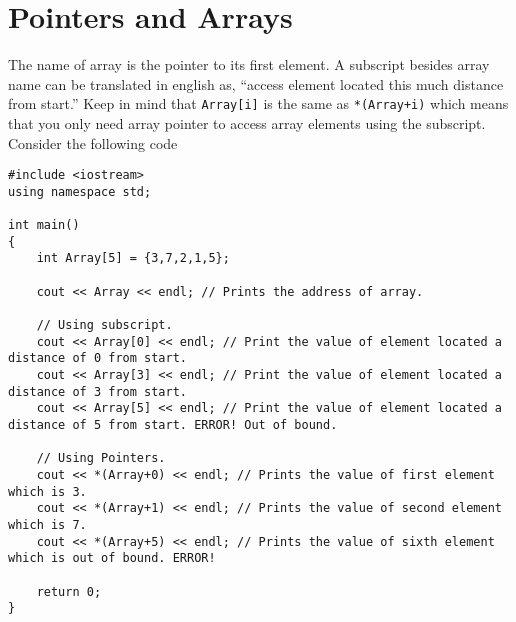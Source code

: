 \documentclass[12pt,a4paper]{article}
\begin{document}
\section{Pointers and Arrays}
The name of array is the pointer to its first element. A subscript besides array name can be translated in english as, ``access element located this much distance from start.'' Keep in mind that \verb|Array[i]| is the same as \verb|*(Array+i)| which means that you only need array pointer to access array elements using the subscript. Consider the following code
\begin{lstlisting}[caption={Arrays and Pointers}]
#include <iostream>
using namespace std;

int main()
{
	int Array[5] = {3,7,2,1,5};

	cout << Array << endl; // Prints the address of array.

	// Using subscript.
	cout << Array[0] << endl; // Print the value of element located a distance of 0 from start.
	cout << Array[3] << endl; // Print the value of element located a distance of 3 from start.
	cout << Array[5] << endl; // Print the value of element located a distance of 5 from start. ERROR! Out of bound.

	// Using Pointers.
	cout << *(Array+0) << endl; // Prints the value of first element which is 3.
	cout << *(Array+1) << endl; // Prints the value of second element which is 7.
	cout << *(Array+5) << endl; // Prints the value of sixth element which is out of bound. ERROR!

	return 0;
}
\end{lstlisting}
\end{document}
